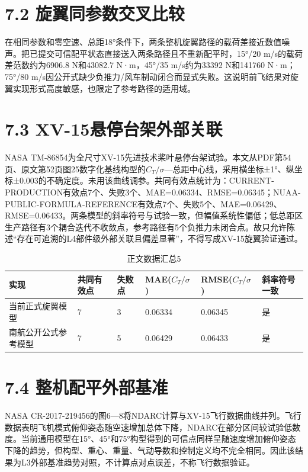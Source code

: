 \documentclass[UTF8,12pt,openany]{ctexbook}
\begin{document}
\section{7.2 旋翼同参数交叉比较}

在相同参数和零空速、总距18°条件下，两条整机旋翼路径的载荷差接近数值噪声。把已提交可信配平状态直接送入两条路径且不重新配平时，15°/20 m/s的载荷差范数约为6906.8 N和43082.7 N·m，45°/35 m/s约为33392 N和141760 N·m；75°/80 m/s因公开式缺少负推力/风车制动闭合而显式失败。这说明前飞结果对旋翼实现形式高度敏感，也限定了参考路径的适用域。

\section{7.3 XV-15悬停台架外部关联}

NASA TM-86854为全尺寸XV-15先进技术桨叶悬停台架试验。本文从PDF第54页、原文第52页图25数字化基线构型的$C_T/\sigma$—总距中心线，采用横坐标±1°、纵坐标±0.003的不确定度。未用该曲线调参。共同有效点统计为：CURRENT-PRODUCTION有效点7个、失败3个、MAE=0.06334、RMSE=0.06345；NUAA-PUBLIC-FORMULA-REFERENCE有效点7个、失败5个、MAE=0.06429、RMSE=0.06433。两条模型的斜率符号与试验一致，但幅值系统性偏低；低总距区生产路径有3个耦合迭代不收敛点，参考路径有5个负推力未闭合点。故只允许陈述“存在可追溯的L4部件级外部关联且偏差显著”，不得写成XV-15旋翼验证通过。

\begin{longtable}{p{}p{}p{}p{}p{}p{}}
\caption{正文数据汇总5}\label{tab:auto-5}\\
\toprule
实现 & 共同有效点 & 失败点 & MAE($C_T/\sigma$) & RMSE($C_T/\sigma$) & 斜率符号一致 \\
\midrule
当前正式旋翼模型 & 7 & 3 & 0.06334 & 0.06345 & 是 \\
南航公开公式参考模型 & 7 & 5 & 0.06429 & 0.06433 & 是 \\
\bottomrule
\end{longtable}

\section{7.4 整机配平外部基准}

NASA CR-2017-219456的图6—8将NDARC计算与XV-15飞行数据曲线并列。飞行数据表明飞机模式俯仰姿态随空速增加总体下降，NDARC在部分区间较试验低数度。当前通用模型在15°、45°和75°构型得到的可信点同样呈随速度增加俯仰姿态下降的趋势，但构型、重心、重量、气动导数和控制定义均不完全相同。因此该结果为L3外部基准趋势对照，不计算点对点误差，不称飞行数据验证。
\end{document}
